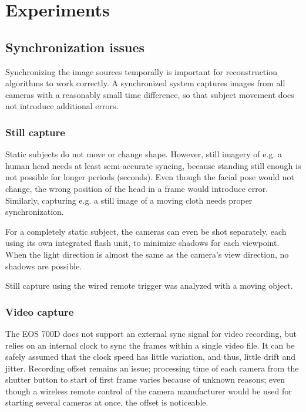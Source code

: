 \section{Experiments}


\subsection{Synchronization issues}

Synchronizing the image sources temporally is important for reconstruction algorithms to work correctly.
A synchronized system captures images from all cameras with a reasonably small time difference, so that subject movement does not introduce additional errors.

\subsubsection{Still capture}

Static subjects do not move or change shape.
However, still imagery of e.g. a human head needs at least semi-accurate syncing, because standing still enough is not possible for longer periods (seconds).
Even though the facial pose would not change, the wrong position of the head in a frame would introduce error.
Similarly, capturing e.g. a still image of a moving cloth needs proper synchronization.

For a completely static subject, the cameras can even be shot separately, each using its own integrated flash unit, to minimize shadows for each viewpoint.
When the light direction is almost the same as the camera's view direction, no shadows are possible.

Still capture using the wired remote trigger was analyzed with a moving object.

\subsubsection{Video capture}

The EOS 700D does not support an external sync signal for video recording, but relies on an internal clock to sync the frames within a single video file.
It can be safely assumed that the clock speed has little variation, and thus, little drift and jitter.
Recording offset remains an issue;
processing time of each camera from the shutter button to start of first frame varies because of unknown reasons; even though a wireless remote control of the camera manufacturer would be used for starting several cameras at once, the offset is noticeable.

